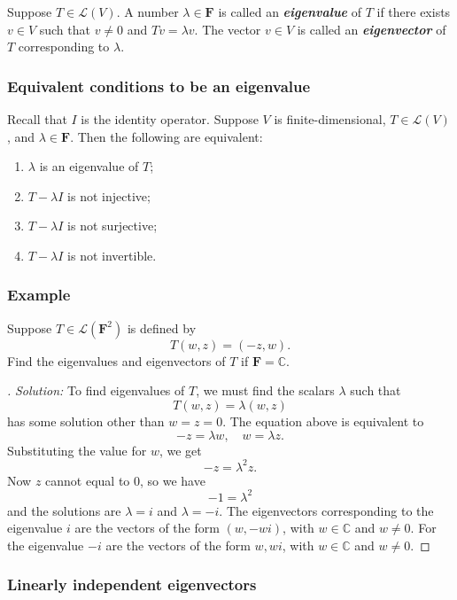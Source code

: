 \documentclass[11pt]{article}
\begin{document}
    Suppose \(T \in \mathcal{L}(V)\). A number \(\lambda \in \textbf{F}\) is called an \textbf{\emph{eigenvalue}} of $T$ if there exists \(v \in V\) such that \(v \neq 0\) and \(Tv = \lambda v.\) The vector \(v \in V\) is called an \textbf{\emph{eigenvector}} of $T$ corresponding to \(\lambda\).

    \subsubsection{Equivalent conditions to be an eigenvalue}

    Recall that \(I\) is the identity operator. Suppose $V$ is finite-dimensional, \(T \in \mathcal{L}(V)\), and \(\lambda \in \textbf{F}\). Then the following are equivalent:
    \begin{enumerate}
        \item \(\lambda\) is an eigenvalue of $T$;
        \item \(T - \lambda I\) is not injective;
        \item \(T - \lambda I\) is not surjective;
        \item \(T - \lambda I\) is not invertible.
    \end{enumerate}

    \subsubsection{Example}

    Suppose \(T \in \mathcal{L}(\textbf{F}^2)\) is defined by \[T(w,z) = (-z,w).\] Find the eigenvalues and eigenvectors of $T$ if \(\textbf{F} = \mathbb{C}\).

    \begin{proof}[\unskip\nopunct]
        \emph{Solution:} To find eigenvalues of $T$, we must find the scalars \(\lambda\) such that \[T(w,z) = \lambda(w,z)\] has some solution other than \(w = z=  0.\) The equation above is equivalent to \[-z = \lambda w, \quad w = \lambda z.\] Substituting the value for $w$, we get \[-z = \lambda^2 z.\] Now $z$ cannot equal to 0, so we have \[-1 = \lambda^2\] and the solutions are \(\lambda = i\) and \(\lambda = -i\). The eigenvectors corresponding to the eigenvalue $i$ are the vectors of the form \((w,-wi)\), with \(w \in \mathbb{C}\) and \(w \neq 0\). For the eigenvalue \(-i\) are the vectors of the form \(w,wi\), with \(w \in \mathbb{C}\) and \(w \neq 0\). 
    \end{proof}

    \subsubsection{Linearly independent eigenvectors}
\end{document}
